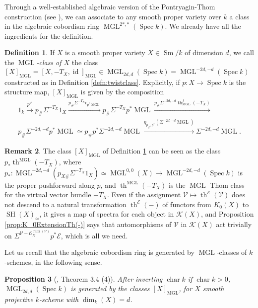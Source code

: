 \documentclass[10pt]{amsart}
\theoremstyle{definition}
\newtheorem{defn}{Definition}[section]
\newtheorem{rmk}[defn]{Remark}
\theoremstyle{plain}
\newtheorem{prop}[defn]{Proposition}
\numberwithin{equation}{section}
\newcommand{\0}{\emptyset}
\newcommand{\sE}{{\mathcal E}}
\newcommand{\sK}{{\mathcal K}}
\newcommand{\sV}{{\mathcal V}}
\newcommand{\MGL}{{\operatorname{MGL}}}
\newcommand{\Spec}{{\operatorname{Spec}}}
\newcommand{\SH}{{\operatorname{SH}}}
\newcommand{\Sm}{{\operatorname{Sm}}}
\renewcommand{\th}{{\operatorname{th}}}
\renewcommand{\dim}{{\operatorname{dim}}}
\newcommand{\rnk}{{\operatorname{rank}}}
\newcommand{\id}{{\operatorname{id}}}
\newcommand{\chr}{{\operatorname{char}}}
\begin{document}
Through a well-established algebraic version of the Pontryagin-Thom construction (see \cite[Section 3]{lev:ellcoh}), we can associate to any smooth proper variety over $k$ a class in the algebraic cobordism ring $\MGL^{2*,*}(\Spec k)$. We already have all the ingredients for the definition.  

\begin{defn}
    \label{defn:MGLclasses}
If $X$ is a smooth proper variety $X \in \Sm/k$ of dimension $d$, we call the \emph{$\MGL$-class of $X$} the class $[X]_\MGL=[X,-T_X,\id]_\MGL \in \MGL_{2d,d}(\Spec k)=\MGL^{-2d,-d}(\Spec k)$ constructed as in Definition \ref{defn:twistclass}. Explicitly, if $p:X \to \Spec k$ is the structure map, $[X]_\MGL$ is given by the composition
\begin{multline*}
    1_k \xrightarrow{p^\vee} p_\# \Sigma^{-T_X}1_X \xrightarrow{p_\#\Sigma^{-T_X}\epsilon_{p^*\MGL}} p_\#\Sigma^{-T_X}p^*\MGL \xrightarrow{p_\#\Sigma^{-2d,-d}\th_{\MGL}^f(-T_X)} \\ p_\#\Sigma^{-2d,-d} p^*\MGL \simeq p_\#p^*\Sigma^{-2d,-d}\MGL \xrightarrow{\eta_{p_\#,p^*}(\Sigma^{-2d,-d}\MGL)}\Sigma^{-2d,-d}\MGL.
 \end{multline*}
\end{defn}

\begin{rmk}
    The class $[X]_\MGL$ of Definition \ref{defn:MGLclasses} can be seen as the class $p_*\th^{\MGL}(-T_X)$, where $p_*:\MGL^{-2d,-d}(p_{X\#}\Sigma^{-T_X}1_X) \simeq \MGL^{0,0}(X) \to \MGL^{-2d,-d}(\Spec k)$ is the proper pushforward along $p$, and $\th^{\MGL}(-T_X)$ is the $\MGL$ Thom class for the virtual vector bundle $-T_X$. Even if the assignment $\sV \mapsto \th^{\sE}(\sV)$ does not descend to a natural transformation $\th^\sE(-)$ of functors from $K_0(X)$ to $\SH(X)_\simeq$, it gives a map of spectra for each object in $\sK(X)$, and Proposition \ref{prop:K_0ExtensionTh(-)} says that automorphisms of $\sV$ in $\sK(X)$ act trivially on $\Sigma^{\sV-\mathcal{O}_X^{\rnk(\sV)}}p^*\sE$, which is all we need.
\end{rmk}

Let us recall that the algebraic cobordism ring is generated by $\MGL$-classes of $k$-schemes, in the following sense.
\begin{prop}[\cite{lev:ellcoh}, Theorem 3.4 (4)]
\label{prop:MGL-classes}
    After inverting  $\chr k$ if $\chr k>0$, $\MGL_{2d,d}(\Spec k)$ is generated by the classes $[X]_\MGL$, for $X$ smooth projective $k$-scheme with $\dim_k(X)=d$.
\end{prop}
\end{document}
